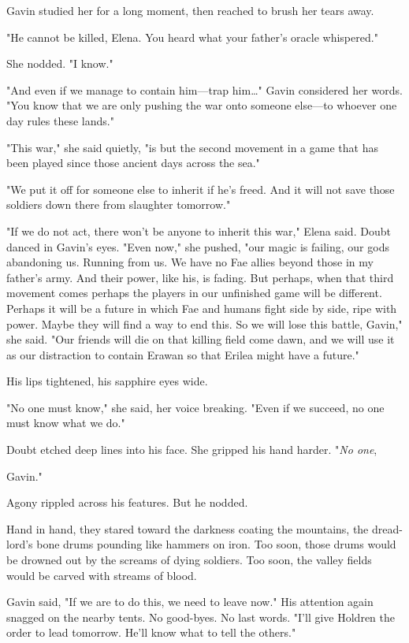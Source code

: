 Gavin studied her for a long moment, then reached to brush her tears away.

"He cannot be killed, Elena. You heard what your father's oracle whispered."

She nodded. "I know."

"And even if we manage to contain him---trap him\ldots" Gavin considered her words. "You know that we are only pushing the war onto someone else---to whoever one day rules these lands."

"This war," she said quietly, "is but the second movement in a game that has been played since those ancient days across the sea."

"We put it off for someone else to inherit if he's freed. And it will not save those soldiers down there from slaughter tomorrow."

"If we do not act, there won't be anyone to inherit this war," Elena said. Doubt danced in Gavin's eyes. "Even now," she pushed, "our magic is failing, our gods abandoning us. Running from us. We have no Fae allies beyond those in my father's army. And their power, like his, is fading. But perhaps, when that third movement comes  perhaps the players in our unfinished game will be different. Perhaps it will be a future in which Fae and humans fight side by side, ripe with power. Maybe they will find a way to end this. So we will lose this battle, Gavin," she said. "Our friends will die on that killing field come dawn, and we will use it as our distraction to contain Erawan so that Erilea might have a future."

His lips tightened, his sapphire eyes wide.

"No one must know," she said, her voice breaking. "Even if we succeed, no one must know what we do."

Doubt etched deep lines into his face. She gripped his hand harder. "\emph{No one},

Gavin."

Agony rippled across his features. But he nodded.

Hand in hand, they stared toward the darkness coating the mountains, the dread-lord's bone drums pounding like hammers on iron. Too soon, those drums would be drowned out by the screams of dying soldiers. Too soon, the valley fields would be carved with streams of blood.

Gavin said, "If we are to do this, we need to leave now." His attention again snagged on the nearby tents. No good-byes. No last words. "I'll give Holdren the order to lead tomorrow. He'll know what to tell the others."

